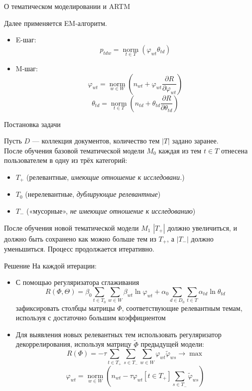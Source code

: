 \documentclass{beamer}
\DeclareMathOperator*{\norm}{\text{norm}}
\begin{document}
\begin{frame}{О тематическом моделировании и ARTM}

Далее применяется EM-алгоритм.

\begin{itemize}
    \item E-шаг:
    $$p_{tdw} = \norm \limits_{t \in T} (\varphi_{wt} \theta_{td})$$
    \item M-шаг: 
    $$
    \varphi_{wt} = \norm \limits_{w \in W} (n_{wt} + \varphi_{wt} \frac{\partial R}{\partial \varphi_{wt}})
    $$
    $$
    \theta_{td} = \norm \limits_{t \in T} (n_{td} + \theta_{td} \frac{\partial R}{\partial \theta_{td}})
    $$
\end{itemize}

\end{frame}
\begin{frame}{Постановка задачи}

Пусть $D$ — коллекция документов, количество тем $|T|$ задано заранее. \\
После обучения базовой тематической модели $M_0$ каждая из тем $t \in T$ отнесена пользователем в одну из трёх категорий:
\begin{itemize}
    \item $T_+$ (релевантные, \textit{имеющие отношение к исследовани.})
    \item $T_0$ (нерелевантные, \textit{дублирующие релевантные})
    \item $T_-$ («мусорные», \textit{не имеющие отношение к исследованию})
\end{itemize}
После обучения новой тематической модели $M_1$ $|T_+|$ должно увеличиться, и должно быть сохранено как можно больше тем из $T_+$, а $|T_-|$ должно уменьшиться. Процесс продолжается итеративно.

\end{frame}
\begin{frame}{Решение}
На каждой итерации:
\begin{itemize}
    \item С помощью регуляризатора сглаживания
    $$R (\Phi, \Theta) = \beta_0 \sum \limits_{t \in T_0} \sum \limits_{w \in W} \beta_{wt} \ln \varphi_{wt} + \alpha_0 \sum \limits_{d \in D_0} \sum \limits_{t \in T} \alpha_{td} \ln \theta_{td}$$
    зафиксировать столбцы матрицы $\Phi$, соответствующие релевантным темам, используя с достаточно большим коэффициентом
    \item Для выявления новых релевантных тем использовать регуляризатор декоррелирования, используя матрицу $\widetilde{\Phi}$ предыдущей модели:
        $$R(\Phi) = -\tau \sum \limits_{t \in T_+} \sum \limits_{s \in T_-} \sum \limits_{w \in W} \varphi_{wt} \widetilde{\varphi}_{ws} \to \max$$
        $$\varphi_{wt} = \norm \limits_{w \in W} \left(n_{wt} - \tau \varphi_{wt} [t \in T_+] \sum \limits_{s \in T_-} \widetilde{\varphi}_{ws}\right)$$
\end{itemize}
\end{frame}
\end{document}
